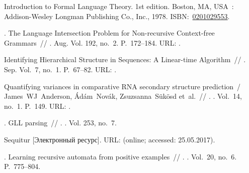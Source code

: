 \begin{thebibliography}{10}
 Introduction to Formal Language Theory. \BibDash
\newblock 1st edition. \BibDash
\newblock Boston, MA, USA~: Addison-Wesley Longman Publishing Co., Inc., 1978.
  \BibDash
\newblock
  ISBN:~\href{http://isbndb.com/search-all.html?kw=0201029553}{0201029553}.

. The Language Intersection Problem
  for Non-recursive Context-free Grammars~//
  \href{http://dx.doi.org/10.1016/j.ic.2004.03.004}{}
  \BibDash
{}. \BibDash Aug. \BibDash
\newblock Vol. 192, no.~2. \BibDash
\newblock P.~172--184. \BibDash
\newblock URL: .

 Identifying Hierarchical
  Structure in Sequences: A Linear-time Algorithm~//  \BibDash
{}. \BibDash Sep. \BibDash
\newblock Vol.~7, no.~1. \BibDash
\newblock P.~67--82. \BibDash
\newblock URL: .

Quantifying variances in comparative RNA secondary structure prediction~/
  James~WJ~Anderson, {\'A}d{\'a}m~Nov{\'a}k, Zsuzsanna~S{\"u}k{\"o}sd et~al.~//
  \href{http://dx.doi.org/10.1186/1471-2105-14-149}{}. \BibDash
{}. \BibDash
\newblock Vol.~14, no.~1. \BibDash
\newblock P.~149. \BibDash
\newblock URL: .

. GLL parsing~//
  \href{http://dx.doi.org/10.1016/j.entcs.2010.08.041}{}. \BibDash
{}. \BibDash
\newblock Vol. 253, no.~7.

Sequitur [Электронный ресурс]. \BibDash
\newblock URL:  (online; accessed:
  25.05.2017).

. Learning recursive automata from positive
  examples~// . \BibDash
{}. \BibDash
\newblock Vol.~20, no.~6. \BibDash
\newblock P.~775--804.


\end{thebibliography}
